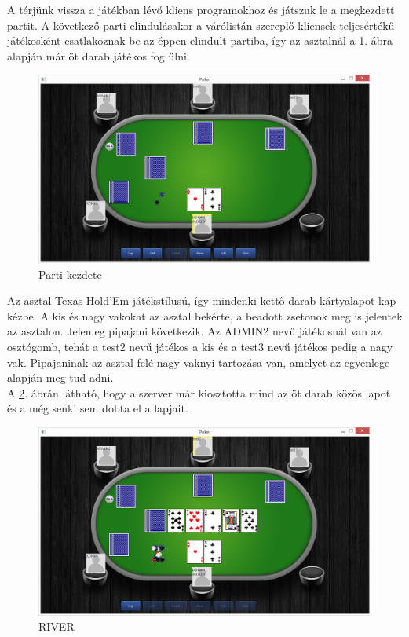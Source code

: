  A térjünk vissza a játékban lévő kliens programokhoz és játszuk le a megkezdett partit. A következő parti elindulásakor a várólistán szereplő kliensek teljesértékű játékosként csatlakoznak be az éppen elindult partiba, így az asztalnál a \ref{fig:parti_2}. ábra alapján már öt darab játékos fog ülni.
 \begin{figure}[h!]
  \caption{Parti kezdete}
  \label{fig:parti_2}
  \centering
    \includegraphics[width=\textwidth]{user-documentation/images/parti/parti_2.jpg}
\end{figure}
Az asztal Texas Hold'Em játékstílusú, így mindenki kettő darab kártyalapot kap kézbe. A kis és nagy vakokat az asztal bekérte, a beadott zsetonok meg is jelentek az asztalon. Jelenleg pipajani következik. Az ADMIN2 nevű játékosnál van az osztógomb, tehát a test2 nevű játékos a kis és a test3 nevű játékos pedig a nagy vak. Pipajaninak az asztal felé nagy vaknyi tartozása van, amelyet az egyenlege alapján meg tud adni. \\
A \ref{fig:parti_3}. ábrán látható, hogy a szerver már kiosztotta mind az öt darab közös lapot és a még senki sem dobta el a lapjait.
 \begin{figure}[h!]
  \caption{RIVER}
  \label{fig:parti_3}
  \centering
    \includegraphics[width=\textwidth]{user-documentation/images/parti/parti_3.jpg}
\end{figure}
